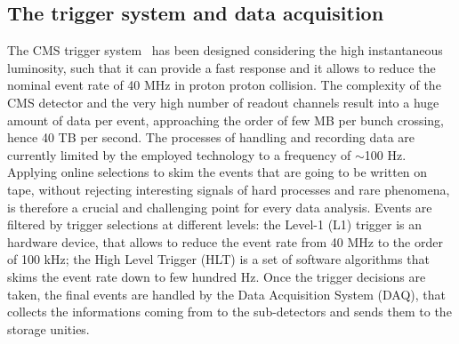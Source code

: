 
\subsection{The trigger system and data acquisition}
The CMS trigger system~\cite{TRIG-TDR} has been designed considering the high instantaneous luminosity, such that it can provide a fast response and it allows to reduce the nominal event rate of 40 MHz in proton proton collision. The complexity of the CMS detector and the very high number of readout channels result into a huge amount of data per event, approaching the order of few MB per bunch crossing, hence 40 TB per second. The processes of handling and recording data are currently limited by the employed technology to a frequency of $\sim$100 Hz. Applying online selections to skim the events that are going to be written on tape, without rejecting interesting signals of hard processes and rare phenomena, is therefore a crucial and challenging point for every data analysis. Events are filtered by trigger selections at different levels: the Level-1 (L1) trigger is an hardware device, that allows to reduce the event rate from 40 MHz to the order of 100 kHz; the High Level Trigger (HLT) is a set of software algorithms that skims the event rate down to few hundred Hz. Once the trigger decisions are taken, the final events are handled by the Data Acquisition System (DAQ), that collects the informations coming from to the sub-detectors and sends them to the storage unities.

